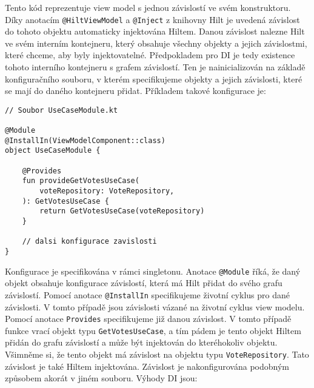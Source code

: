 \noindent Tento kód reprezentuje view model s jednou závislostí ve svém konstruktoru. Díky anotacím  \lstinline|@HiltViewModel| a \lstinline|@Inject| z knihovny Hilt je uvedená závislost do tohoto objektu automaticky injektována Hiltem. Danou závislost nalezne Hilt ve svém interním kontejneru, který obsahuje všechny objekty a jejich závislostmi, které chceme, aby byly injektovatelné. Předpokladem pro DI je tedy existence tohoto interního kontejneru s grafem závislostí. Ten je nainicializován na základě konfiguračního souboru, v kterém specifikujeme objekty a jejich závislosti, které se mají do daného kontejneru přidat. Příkladem takové konfigurace je:

\begin{lstlisting}[caption={Ukázka konfigurace DI pro Hilt}, label={lst:hilt-config}, tabsize=2]
// Soubor UseCaseModule.kt

@Module
@InstallIn(ViewModelComponent::class)
object UseCaseModule {	
	
	@Provides
	fun provideGetVotesUseCase(
		voteRepository: VoteRepository,
	): GetVotesUseCase {
		return GetVotesUseCase(voteRepository)
	}

	// dalsi konfigurace zavislosti
}
\end{lstlisting}

\noindent Konfigurace je specifikována v rámci singletonu. Anotace \lstinline|@Module| říká, že daný objekt obsahuje konfigurace závislostí, která má Hilt přidat do svého grafu závislostí. Pomocí anotace \lstinline|@InstallIn| specifikujeme životní cyklus pro dané závislosti. V tomto případě jsou závislosti vázané na životní cyklus view modelu. Pomocí anotace \lstinline|Provides| specifikujeme již danou závislost. V tomto případě funkce vrací objekt typu \lstinline|GetVotesUseCase|, a tím pádem je tento objekt Hiltem přidán do grafu závislostí a může být injektován do kteréhokoliv objektu. Všimněme si, že tento objekt má závislost na objektu typu \lstinline|VoteRepository|. Tato závislost je také Hiltem injektována. Závislost je nakonfigurována podobným způsobem akorát v jiném souboru. Výhody DI jsou:


